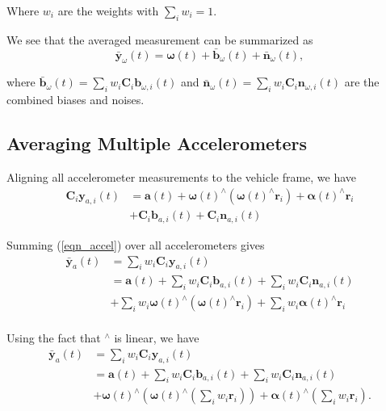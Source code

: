 \documentclass[conference]{IEEEtran}
\begin{document}
\noindent Where $w_i$ are the weights with $\sum_i{w_i} = 1$.

We see that the averaged measurement can be summarized as
\begin{equation}
    \bar{\textbf{y}}_\omega(t) = \bm{\omega}(t) + \bar{\textbf{b}}_\omega(t) + \bar{\textbf{n}}_\omega(t),
\end{equation}

\noindent where $\bar{\textbf{b}}_\omega(t) = \sum_i{w_i \textbf{C}_{i} \textbf{b}_{\omega,i}(t)}$ and $\bar{\textbf{n}}_\omega(t) = \sum_i{w_i \textbf{C}_{i} \textbf{n}_{\omega,i}(t)}$ are the combined biases and noises.

\subsection{Averaging Multiple Accelerometers}

Aligning all accelerometer measurements to the vehicle frame, we have
\begin{equation}\label{eqn_accel}
\begin{split}
    \textbf{C}_{i} \textbf{y}_{a,i}(t) &= \textbf{a}(t) + \bm{\omega}(t)^\wedge (\bm{\omega}(t)^\wedge \textbf{r}_i) + \bm{\alpha}(t)^\wedge \textbf{r}_i \\
    &+ \textbf{C}_{i} \textbf{b}_{a,i}(t) + \textbf{C}_{i} \textbf{n}_{a,i}(t)
\end{split}
\end{equation}

\noindent Summing (\ref{eqn_accel}) over all accelerometers gives
\begin{equation}
\begin{split}
    \bar{\textbf{y}}_a(t) &= \sum_i{w_i \textbf{C}_{i} \textbf{y}_{a,i}(t)} \\
    &= \textbf{a}(t) + \sum_i{w_i \textbf{C}_{i} \textbf{b}_{a,i}(t)} + \sum_i{w_i \textbf{C}_{i} \textbf{n}_{a,i}(t)} \\
    &+ \sum_i{w_i \bm{\omega}(t)^\wedge (\bm{\omega}(t)^\wedge \textbf{r}_i)} + \sum_i{w_i \bm{\alpha}(t)^\wedge \textbf{r}_i} \\
\end{split}
\end{equation}

\noindent Using the fact that $^\wedge$ is linear, we have
\begin{equation}\label{accel_avg_final}
\begin{split}
    \bar{\textbf{y}}_a(t) &= \sum_i{w_i \textbf{C}_{i} \textbf{y}_{a,i}(t)} \\
    &= \textbf{a}(t) + \sum_i{w_i \textbf{C}_{i} \textbf{b}_{a,i}(t)} + \sum_i{w_i \textbf{C}_{i} \textbf{n}_{a,i}(t)} \\
    &+ \bm{\omega}(t)^\wedge \left(\bm{\omega}(t)^\wedge \left( \sum_i{w_i \textbf{r}_i} \right) \right) + \bm{\alpha}(t)^\wedge \left( \sum_i{w_i\textbf{r}_i} \right).
\end{split}
\end{equation}
\end{document}
